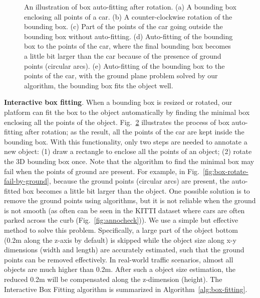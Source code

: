 \documentclass[letterpaper, 10 pt, conference]{ieeeconf}  %
\begin{document}
\begin{figure}[t]
\begin{subfigure}[t]{0.18\linewidth}
		\caption{}
		\label{fig:box-rotate-correctly}
	\end{subfigure}\hfill
	\caption{ 
		An illustration of box auto-fitting after rotation. (a) A bounding box enclosing all points of a car. (b) A counter-clockwise rotation of the bounding box. (c) Part of the points of the car going outside the bounding box without auto-fitting. (d) Auto-fitting of the bounding box to the points of the car, where the final bounding box becomes a little bit larger than the car because of the presence of ground points (circular arcs). (e) Auto-fitting of the bounding box to the points of the car, with the ground plane problem solved by our algorithm,  the bounding box fits the object well.}
	\label{fig:boundary-aware-rotation}
	\vspace{-0.3cm}
\end{figure}



\textbf{Interactive box fitting}. 
When a bounding box is resized or rotated, our platform can fit the box to the object automatically by finding the minimal box enclosing all the points of the object. Fig.~\ref{fig:boundary-aware-rotation} illustrates the process of box auto-fitting after rotation; as the result, all the points of the car are kept inside the bounding box. 
With this functionality, only two steps are needed to annotate a new object: (1) draw a rectangle to enclose all the points of an object; (2) rotate the 3D bounding box once. Note that the algorithm to find the minimal box may fail when the points of ground are present. 
For example, in Fig.~\ref{fig:box-rotate-fail-by-ground}, because the ground points (circular arcs) are present, the auto-fitted box becomes a little bit larger than the object. 
One possible solution is to remove the ground points using algorithms, but it is not reliable when the ground is not smooth (as often can be seen in the KITTI dataset \cite{Geiger2012CVPR} where cars are often parked across the curb (Fig.~\ref{fig:annocheck})). We use a simple but effective method to solve this problem. Specifically, a large part  of the object bottom  (0.2m along the z-axis by default) is skipped while the object size along x-y dimensions (width and length) are accurately estimated, such that the ground points can be removed effectively. In real-world traffic scenarios, almost all objects are much higher than 0.2m. After such a object size estimation, the reduced 0.2m will be compensated along the z-dimension (height). The Interactive Box Fitting algorithm is summarized in Algorithm~\ref{alg:box-fitting}.
\end{document}
